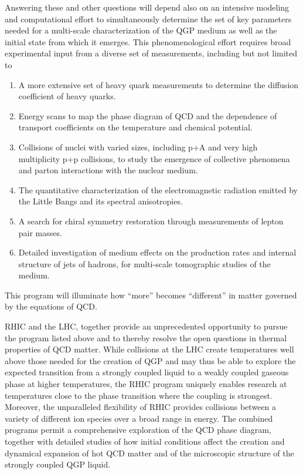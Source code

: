 Answering these and other questions will depend also on an intensive modeling and computational effort to
simultaneously determine the set of key parameters needed for a multi-scale characterization of the QGP medium as well as the initial state from which it emerges. This phenomenological effort requires broad experimental input from a diverse set of measurements, including but not limited to
\begin{enumerate}

\item A more extensive set of heavy quark measurements to determine the diffusion coefficient of heavy quarks.

\item Energy scans to map the phase diagram of QCD and the dependence of transport coefficients on the temperature and chemical potential.

\item  Collisions of nuclei with varied sizes, including p+A and very high multiplicity p+p collisions, to study the emergence of collective phenomena and parton interactions with the nuclear medium.

\item The quantitative characterization of the electromagnetic radiation emitted by the Little Bangs and its spectral anisotropies.

\item A search for chiral symmetry restoration through measurements of lepton pair masses.

\item Detailed investigation of medium effects on the production rates and internal structure of jets of hadrons, for multi-scale tomographic studies of the medium. 
\end{enumerate}
This program will illuminate how ``more'' becomes ``different'' in matter governed by the equations of QCD.

RHIC and the LHC, together provide an unprecedented opportunity to pursue the program listed above and to thereby resolve the open questions in thermal properties of QCD matter. While collisions at the LHC create temperatures well above those needed for the creation of QGP and may thus be able to explore the expected transition from a strongly coupled liquid to a weakly coupled gaseous phase at higher temperatures, the RHIC program uniquely enables  research at temperatures close to the phase transition where the coupling is strongest. Moreover, the unparalleled flexibility of RHIC provides collisions between a variety of different ion species over a broad range in energy. The combined programs permit a comprehensive exploration of the QCD phase diagram, together with detailed studies of how initial conditions affect the creation and dynamical expansion of hot QCD matter and of the microscopic structure of the strongly coupled QGP liquid.

